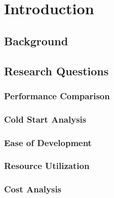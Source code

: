 \chapter{Introduction}
\section{Background}
\section{Research Questions}
\subsection{Performance Comparison}
\subsection{Cold Start Analysis}
\subsection{Ease of Development}
\subsection{Resource Utilization}
\subsection{Cost Analysis}